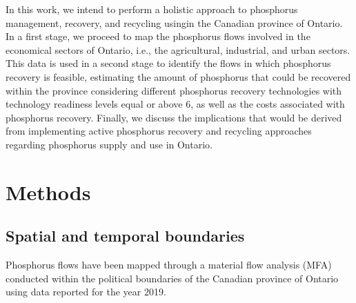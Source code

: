 \documentclass[authoryear]{elsarticle}
\begin{document}
In this work, we intend to perform a holistic approach to phosphorus management,
recovery, and recycling usingin the Canadian province of Ontario. In a first stage, we proceed to map the phosphorus flows involved in the economical sectors of Ontario, i.e., the agricultural, industrial, and urban sectors. This data is used in a second stage to identify the flows in which phosphorus recovery is feasible, estimating the amount of phosphorus that could be recovered within the province considering
different phosphorus recovery technologies with technology readiness levels equal or above 6, as well as the costs associated with phosphorus recovery. Finally, we discuss the implications that would be derived from implementing active phosphorus recovery and recycling approaches regarding phosphorus supply and use in Ontario.

\section{Methods}

%

\subsection{Spatial  and temporal boundaries}
Phosphorus flows have been mapped through a material flow analysis (MFA) \citep{brunner2016handbook} conducted within the political boundaries of the Canadian province of Ontario using data reported for the year 2019. 
%
%
\end{document}
